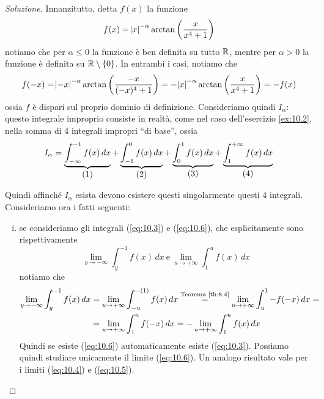 \begin{proof}[Soluzione]
    Innanzitutto, detta $f(x)$ la funzione 
    \[
    f(x) = \abs{x}^{-\alpha}\arctan\left(\frac{x}{x^4+1}\right)
    \]
    notiamo che per $\alpha\le 0$ la funzione è ben definita su tutto $\amsbb{R}$, mentre per $\alpha>0$ la funzione è definita su $\amsbb{R}\setminus\{0\}$. In entrambi i casi, notiamo che 
    \[
    f(-x) = \abs{-x}^{-\alpha}\arctan\left(\frac{-x}{(-x)^4+1}\right) = -\abs{x}^{-\alpha} \arctan\left(\frac{x}{x^4+1}\right) = -f(x)
    \]
    ossia $f$ è dispari sul proprio dominio di definizione. Consideriamo quindi $I_\alpha$: questo integrale improprio consiste in realtà, come nel caso dell'esercizio \ref{ex:10.2}, nella somma di 4 integrali impropri ``di base'', ossia
    \[
    I_\alpha =  \underbrace{\int_{-\infty}^{-1} f(x)\, dx}_{\stepcounter{equation}\mbox{(\theequation)}} + \underbrace{\int_{-1}^0 f(x)\, dx}_{\stepcounter{equation}\mbox{(\theequation)}} + \underbrace{\int_0^1 f(x)\, dx}_{\stepcounter{equation}\mbox{(\theequation)}} + \underbrace{\int_1^{+\infty} f(x)\, dx}_{\stepcounter{equation}\mbox{(\theequation)}}
    \]
    \addtocounter{equation}{-4}\label{eq:10.3}
    \addtocounter{equation}{0}\label{eq:10.4}
    \addtocounter{equation}{0}\label{eq:10.5}
    \addtocounter{equation}{0}\label{eq:10.6}
    Quindi affinché $I_\alpha$ esista devono esistere questi singolarmente questi 4 integrali. Consideriamo ora i fatti seguenti:
    \begin{enumerate}[(i)]
        \item se consideriamo gli integrali (\ref{eq:10.3}) e (\ref{eq:10.6}), che esplicitamente sono rispettivamente
        \[
        \lim_{y\to-\infty} \int_y^{-1} f(x)\, dx \ \text{e} \ \lim_{u\to +\infty} \int_1^u f(x)\, dx
        \]
        notiamo che
        \[
        \begin{split}
            \lim_{y\to-\infty} \int_{y}^{-1} f(x)\, dx &= \lim_{u\to+\infty} \int_{-u}^{-(1)} f(x)\, dx \overset{\text{Teorema \ref{th:8.4}}}{=} \lim_{u\to +\infty} \int_u^{1} -f(-x)\, dx = \\
            & = \lim_{u\to+\infty} \int_1^u f(-x)\, dx = -\lim_{u\to+\infty} \int_1^u f(x)\, dx
        \end{split}
        \]
        Quindi se esiste (\ref{eq:10.6}) automaticamente esiste (\ref{eq:10.3}). Possiamo quindi studiare unicamente il limite (\ref{eq:10.6}). Un analogo risultato vale per i limiti (\ref{eq:10.4}) e (\ref{eq:10.5}).

\end{enumerate}
\end{proof}

